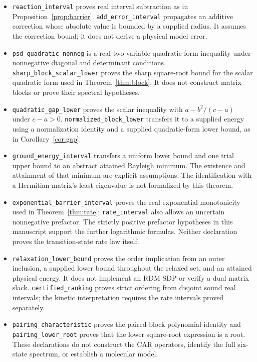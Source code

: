 \documentclass[11pt,a4paper]{article}
\theoremstyle{plain}
\theoremstyle{definition}
\theoremstyle{remark}
\providecommand{\path}[1]{\texttt{#1}}
\begin{document}
\begin{sloppypar}
\begin{itemize}
\item \path{reaction_interval} proves real interval subtraction as in
Proposition~\ref{prop:barrier}. \path{add_error_interval} propagates an
additive correction whose absolute value is bounded by a supplied radius.
It assumes the correction bound; it does not derive a physical model error.
\item \path{psd_quadratic_nonneg} is a real two-variable quadratic-form
inequality under nonnegative diagonal and determinant conditions.
\path{sharp_block_scalar_lower} proves the sharp square-root bound for the
scalar quadratic form used in Theorem~\ref{thm:block}. It does not construct
matrix blocks or prove their spectral hypotheses.
\item \path{quadratic_gap_lower} proves the scalar inequality with
$a-b^2/(c-a)$ under $c-a>0$. \path{normalized_block_lower} transfers it
to a supplied energy using a normalization identity and a supplied
quadratic-form lower bound, as in Corollary~\ref{cor:gap}.
\item \path{ground_energy_interval} transfers a uniform lower bound and
one trial upper bound to an abstract attained Rayleigh minimum. The existence
and attainment of that minimum are explicit assumptions. The identification
with a Hermitian matrix's least eigenvalue is not formalized by this theorem.
\item \path{exponential_barrier_interval} proves the real exponential
monotonicity used in Theorem~\ref{thm:rate}; \path{rate_interval} also
allows an uncertain nonnegative prefactor. The strictly positive prefactor
hypotheses in this manuscript support the further logarithmic formulas.
Neither declaration proves the transition-state rate law itself.
\item \path{relaxation_lower_bound} proves the order implication from an
outer inclusion, a supplied lower bound throughout the relaxed set, and an
attained physical energy. It does not implement an RDM SDP or verify a dual
matrix slack. \path{certified_ranking} proves strict ordering from disjoint
sound real intervals; the kinetic interpretation requires the rate intervals
proved separately.
\item \path{pairing_characteristic} proves the paired-block polynomial
identity and \path{pairing_lower_root} proves that the lower square-root
expression is a root. These declarations do not construct the CAR operators,
identify the full six-state spectrum, or establish a molecular model.

\end{itemize}
\end{sloppypar}
\end{document}
